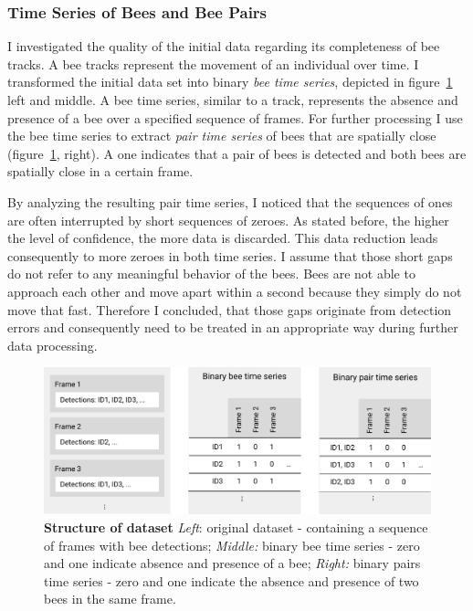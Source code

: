 \subsubsection{Time Series of Bees and Bee Pairs}
\label{subsec:tracking}
I investigated the quality of the initial data regarding its completeness of bee tracks. A bee tracks represent the movement of an individual over time. I transformed the initial data set into binary \emph{bee time series}, depicted in figure~\ref{fig:structure} left and middle.
A bee time series, similar to a track, represents the absence and presence of a bee over a specified sequence of frames.
For further processing I use the bee time series to extract \emph{pair time series} of bees that are spatially close (figure~\ref{fig:structure}, right).
A one indicates that a pair of bees is detected and both bees are spatially close in a certain frame.


By analyzing the resulting pair time series, I noticed that the sequences of ones are often interrupted by short sequences of zeroes.
As stated before, the higher the level of confidence, the more data is discarded. This data reduction leads consequently to more zeroes in both time series.
I assume that those short gaps do not refer to any meaningful behavior of the bees. Bees are not able to approach each other and move apart within a second because they simply do not move that fast.
Therefore I concluded, that those gaps originate from detection errors and consequently need to be treated in an appropriate way during further data processing.

\begin{figure}[htb]
	\centering
	\includegraphics[width=1.0\textwidth]{Figures/structure}
	\caption[Structure of dataset]{\textbf{Structure of dataset} \emph{Left}: original dataset - containing a sequence of frames with bee detections; \emph{Middle:} binary bee time series - zero and one indicate absence and presence of a bee; \emph{Right:} binary pairs time series - zero and one indicate the absence and presence of two bees in the same frame.}
	\label{fig:structure}
\end{figure}